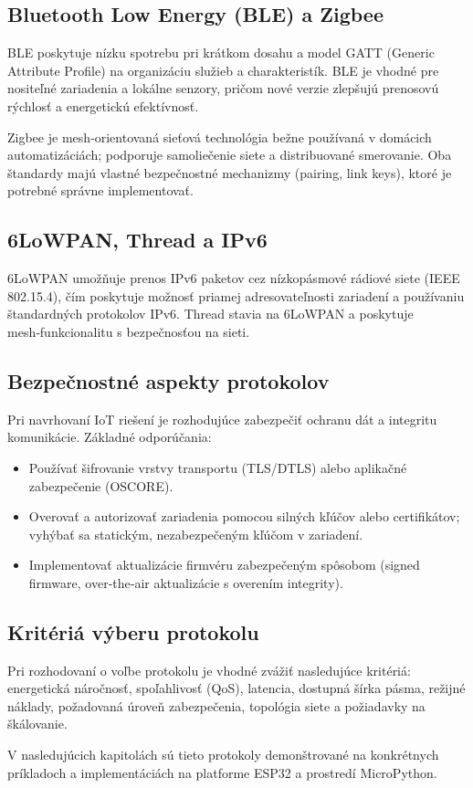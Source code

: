 \subsection{Bluetooth Low Energy (BLE) a Zigbee}

BLE poskytuje nízku spotrebu pri krátkom dosahu a model GATT (Generic Attribute Profile) na organizáciu služieb a charakteristík. BLE je vhodné pre nositeľné zariadenia a lokálne senzory, pričom nové verzie zlepšujú prenosovú rýchlosť a energetickú efektívnosť.

Zigbee je mesh‑orientovaná sieťová technológia bežne používaná v domácich automatizáciách; podporuje samoliečenie siete a distribuované smerovanie. Oba štandardy majú vlastné bezpečnostné mechanizmy (pairing, link keys), ktoré je potrebné správne implementovať.

\subsection{6LoWPAN, Thread a IPv6}

6LoWPAN umožňuje prenos IPv6 paketov cez nízkopásmové rádiové siete (IEEE 802.15.4), čím poskytuje možnosť priamej adresovateľnosti zariadení a používaniu štandardných protokolov IPv6. Thread stavia na 6LoWPAN a poskytuje mesh‑funkcionalitu s bezpečnosťou na sieti.

\subsection{Bezpečnostné aspekty protokolov}

Pri navrhovaní IoT riešení je rozhodujúce zabezpečiť ochranu dát a integritu komunikácie. Základné odporúčania:
\begin{itemize}
  \item Používať šifrovanie vrstvy transportu (TLS/DTLS) alebo aplikačné zabezpečenie (OSCORE).
  \item Overovať a autorizovať zariadenia pomocou silných kľúčov alebo certifikátov; vyhýbať sa statickým, nezabezpečeným kľúčom v zariadení.
  \item Implementovať aktualizácie firmvéru zabezpečeným spôsobom (signed firmware, over‑the‑air aktualizácie s overením integrity).
\end{itemize}

\subsection{Kritériá výberu protokolu}

Pri rozhodovaní o voľbe protokolu je vhodné zvážiť nasledujúce kritériá: energetická náročnosť, spoľahlivosť (QoS), latencia, dostupná šírka pásma, režijné náklady, požadovaná úroveň zabezpečenia, topológia siete a požiadavky na škálovanie.

V nasledujúcich kapitolách sú tieto protokoly demonštrované na konkrétnych príkladoch a implementáciách na platforme ESP32 a prostredí MicroPython.

